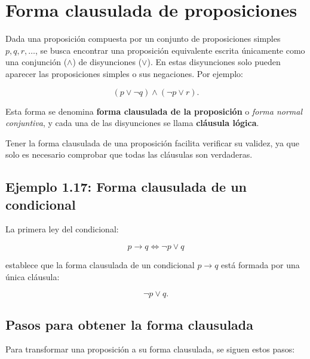 








\section{Forma clausulada de proposiciones}

Dada una proposición compuesta por un conjunto de proposiciones simples \(p,
q, r, \dots\), se busca encontrar una proposición equivalente escrita
únicamente como una conjunción (\(\land\)) de disyunciones (\(\lor\)). En
estas disyunciones solo pueden aparecer las proposiciones simples o sus
negaciones. Por ejemplo:

\[ (p \lor \neg q) \land (\neg p \lor r). \]

Esta forma se denomina \textbf{forma clausulada de la proposición} o
\emph{forma normal conjuntiva}, y cada una de las disyunciones se llama
\textbf{cláusula lógica}.

Tener la forma clausulada de una proposición facilita verificar su validez,
ya que solo es necesario comprobar que todas las cláusulas son verdaderas.

\subsection{Ejemplo 1.17: Forma clausulada de un condicional}

La primera ley del condicional:

\[ p \to q \iff \neg p \lor q \]

\noindent establece que la forma clausulada de un condicional \(p \to q\)
está formada por una única cláusula:

\[ \neg p \lor q. \]

\subsection{Pasos para obtener la forma clausulada}

Para transformar una proposición a su forma clausulada, se siguen estos
pasos:

